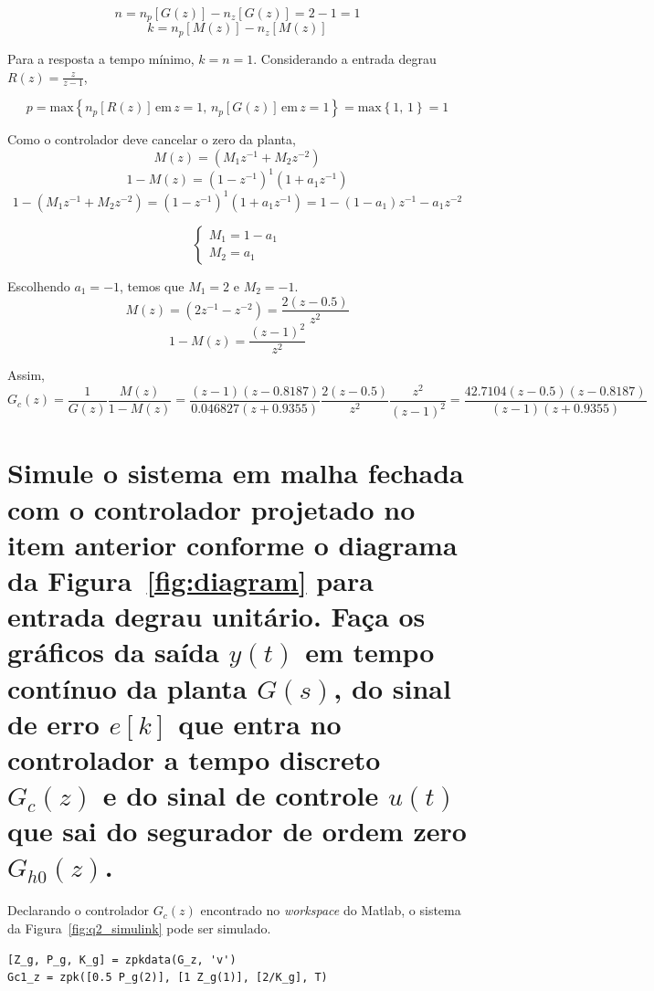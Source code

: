 \documentclass{article}
\begin{document}
        \[ n = n_p[G(z)] - n_z[G(z)] = 2 - 1 = 1 \]
        \[ k = n_p[M(z)] - n_z[M(z)] \]

        {Para a resposta a tempo mínimo, $k = n = 1$.}
        {Considerando a entrada degrau $R(z) = \frac{z}{z-1}$,}

        \[ p = \mathrm{max}\left\{ n_p[R(z)] \mathrm{\,em\,} z=1,\,
                n_p[G(z)] \mathrm{\,em\,} z=1 \right\}
             = \mathrm{max}\left\{ 1, \,1 \right\}
             = 1 \]

        {Como o controlador deve cancelar o zero da planta,}
        \[ M(z) = (M_1 z^{-1} + M_2 z^{-2}) \]
        \[ 1 - M(z) = (1-z^{-1})^1 (1+ a_1 z^{-1}) \]
        \[ 1 - (M_1 z^{-1} + M_2 z^{-2}) = (1-z^{-1})^1 (1+ a_1 z^{-1})
            = 1-(1-a_1)z^{-1} - a_1 z^{-2} \]

        \[\begin{cases}
            M_1 = 1 - a_1\\
            M_2 = a_1
        \end{cases}\]

        {Escolhendo $a_1 = -1$, temos que $M_1 = 2$ e $M_2 = -1$.}
        \[ M(z) = (2z^{-1} - z^{-2}) = \frac{2(z-0.5)}{z^2} \]
        \[ 1 - M(z) = \frac{(z-1)^2}{z^2} \]

        {Assim,}
        \[ G_c(z) = \frac{1}{G(z)}\frac{M(z)}{1-M(z)}
                  = \frac{(z-1)(z-0.8187)}{0.046827(z+0.9355)}
                    \frac{2(z-0.5)}{z^2} \frac{z^2}{(z-1)^2}
                  = \frac{42.7104(z-0.5)(z-0.8187)}{(z-1)(z+0.9355)} \]


    \section{\normalsize{\normalfont Simule o sistema em malha fechada com o
    controlador projetado no item anterior conforme o diagrama da
    Figura~\ref{fig:diagram} para entrada degrau unitário. Faça os gráficos da
    saída $y(t)$ em tempo contínuo da planta $G(s)$, do sinal de erro $e[k]$
    que entra no controlador a tempo discreto $G_c(z)$ e do sinal de controle
    $u(t)$ que sai do segurador de ordem zero $G_{h0}(z)$.}}

        {Declarando o controlador $G_c(z)$ encontrado no \textit{workspace} do
        Matlab, o sistema da Figura~\ref{fig:q2_simulink} pode ser simulado.}
        \begin{lstlisting}
[Z_g, P_g, K_g] = zpkdata(G_z, 'v')
Gc1_z = zpk([0.5 P_g(2)], [1 Z_g(1)], [2/K_g], T)
        \end{lstlisting}
\end{document}
